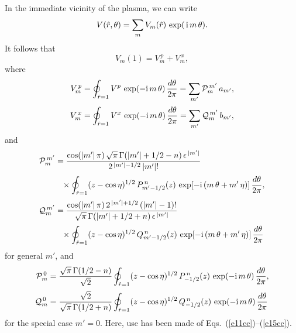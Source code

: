 \documentclass[12pt,prb,aps]{revtex4-1}
\begin{document}
In the immediate vicinity of the plasma, we can write
\begin{equation}
V(\hat{r},\theta) = \sum_m V_m(\hat{r})\,\exp(\,{\rm i}\,m\,\theta).
\end{equation}
It follows that
\begin{equation}\label{e343}
V_m(1) = V_m^{\,p} + V_m^{\,x},
\end{equation}
where
\begin{align}\label{e344}
V_m^{\,p} &= \oint_{\hat{r}=1}V^p\,\exp(-{\rm i}\,m\,\theta)\,\frac{d\theta}{2\pi}= \sum_{m'}{\cal P}_m^{\,m'}\,a_{m'},\\[0.5ex]
V_m^{\,x} &= \oint_{\hat{r}=1}V^x\,\exp(-{\rm i}\,m\,\theta)\,\frac{d\theta}{2\pi}= \sum_{m'}{\cal Q}_m^{\,m'}\,b_{m'},\label{e345}
\end{align}
and
\begin{align}
{\cal P}_m^{\,m'} &=
\frac{\cos(|m'|\,\pi)\,\sqrt{\pi}\,\Gamma(|m'|+1/2-n)\,\epsilon^{\,|m'|}}{2^{\,|m'|-1/2}\,|m'|!}\nonumber\\[0.5ex]
&\phantom{=}\times
\oint_{\hat{r}=1}(z-\cos\eta)^{1/2}\,P_{m'-1/2}^{\,n}(z)\,\exp[-{\rm i}\,(m\,\theta+m'\,\eta)]\,\frac{d\theta}{2\pi},\label{e346}\\[0.5ex]
{\cal Q}_m^{\,m'} &=\frac{\cos(|m'|\,\pi)\,2^{\,|m'|+1/2}\,(|m'|-1)!}{\sqrt{\pi}\,\Gamma(|m'|+1/2+n)\,\epsilon^{\,|m'|}}\nonumber\\[0.5ex]
&\phantom{=}\times
\oint_{\hat{r}=1}
(z-\cos\eta)^{1/2}\,Q_{m'-1/2}^{\,n}(z)\,\exp[-{\rm i}\,(m\,\theta+m'\,\eta)]\,\frac{d\theta}{2\pi}
\end{align}
for general $m'$, and 
\begin{align}
{\cal P}_m^{\,0} &=
\frac{\sqrt{\pi}\,\Gamma(1/2-n)}{\sqrt{2}}\oint_{\hat{r}=1}
(z-\cos\eta)^{1/2}\,P_{-1/2}^{\,n}(z)\,\exp(-{\rm i}\,m\,\theta)\,\frac{d\theta}{2\pi},\label{e348}\\[0.5ex]
{\cal Q}_m^{\,0} &=\frac{\sqrt{2}}{\sqrt{\pi}\,\Gamma(1/2+n)}
\oint_{\hat{r}=1}
(z-\cos\eta)^{1/2}\,Q_{-1/2}^{\,n}(z)\,\exp(-{\rm i}\,m\,\theta)\,\frac{d\theta}{2\pi}
\end{align}
for the special case $m'=0$. Here, use has been made of Eqs.~(\ref{e11cc})--(\ref{e15cc}).
\end{document}
